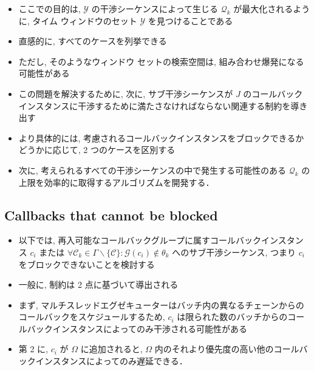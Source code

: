 \begin{frame}{}
    \begin{itemize}
        \item ここでの目的は, $\mathcal{Y}$ の干渉シーケンスによって生じる $\mathcal{Q}_{k}$ が最大化されるように, タイム ウィンドウのセット $\mathcal{Y}$ を見つけることである
        \item 直感的に, すべてのケースを列挙できる
        \item ただし, そのようなウィンドウ セットの検索空間は, 組み合わせ爆発になる可能性がある
        \item この問題を解決するために, 次に, サブ干渉シーケンスが $J$ のコールバックインスタンスに干渉するために満たさなければならない関連する制約を導き出す
        \item より具体的には, 考慮されるコールバックインスタンスをブロックできるかどうかに応じて, 2 つのケースを区別する
        \item 次に, 考えられるすべての干渉シーケンスの中で発生する可能性のある $\mathcal{Q}_{k}$ の上限を効率的に取得するアルゴリズムを開発する．
    \end{itemize}
\end{frame}


\subsection{Callbacks that cannot be blocked}
\label{ssec: callbacks_that_cannot_be_blocked}

\begin{frame}{}
    \begin{itemize}
        \item 以下では, 再入可能なコールバックグループに属すコールバックインスタンス $c_{i}$ または $\forall \mathcal{C}_{k} \in \Gamma \backslash\{\mathcal{C}\}: \mathcal{G}\left(c_{i}\right) \notin \theta_{k}$ へのサブ干渉シーケンス, つまり $c_{i}$ をブロックできないことを検討する
        \item 一般に, 制約は 2 点に基づいて導出される
        \item まず, マルチスレッドエグゼキューターはバッチ内の異なるチェーンからのコールバックをスケジュールするため, $c_{i}$ は限られた数のバッチからのコールバックインスタンスによってのみ干渉される可能性がある
        \item 第 2 に, $c_{i}$ が $\Omega$ に追加されると, $\Omega$ 内のそれより優先度の高い他のコールバックインスタンスによってのみ遅延できる．
    \end{itemize}
\end{frame}

